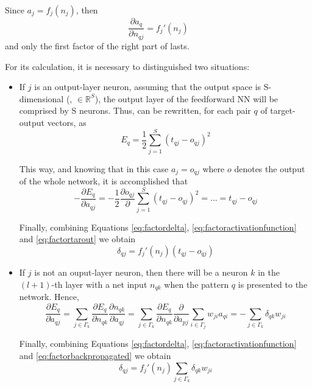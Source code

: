 Since $a_{j}=f_{j}(n_{j})$, then
\begin{equation}
\frac{\partial a_{q}}{\partial n_{qj}}=
f_{j}'(n_{j})
\label{eq:factoractivationfunction}
\end{equation}
and only the first factor of the right part of  lasts. 

For its calculation, it is necessary to distinguished two situations:
\begin{itemize} 
\item If $j$ is an output-layer neuron, assuming that the output space is S-dimensional (\ie, $\in\mathbb{R}^S$), the output layer of the feedforward NN will be comprised by S neurons. Thus,  can be rewritten, for each pair $q$ of target-output vectors, as 
\begin{equation}
E_{q}=\frac{1}{2}\sum_{j=1}^{S} (t_{qj}-o_{qj})^2
\label{eq:patternerrorfunction}
\end{equation}

This way, and knowing that in this case $a_{j}=o_{qj}$ where $o$ denotes the output of the whole network, it is accomplished that
\begin{equation}
-\frac{\partial E_{q}}{\partial a_{qj}} =
-\frac{1}{2}\frac{\partial o_{qj}}{\partial}
\sum_{j=1}^{S} (t_{qj}-o_{qj})^2 =
...= t_{qj}-o_{qj}
\label{eq:factortarout}
\end{equation}

Finally, combining Equations \ref{eq:factordelta}, \ref{eq:factoractivationfunction} and \ref{eq:factortarout} we obtain
\begin{equation}
\delta_{qj}= f_{j}'(n_{j})(t_{qj}-o_{qj})
\label{eq:deltajoutput}
\end{equation}


\item If $j$ is not an ouput-layer neuron, then there will be a neuron $k$ in the $(l+1)$-th layer with a net input $n_{qk}$ when the pattern $q$ is presented to the network. Hence,
\begin{equation}
\frac{\partial E_{q}}{\partial a_{qj}}=
\sum_{j\in \Gamma_{k}}
\frac{\partial E_{q}}{\partial n_{qk}}
\frac{\partial n_{qk}}{\partial a_{qj}}=
\sum_{j\in \Gamma_{k}}
\frac{\partial E_{q}}{\partial n_{qk}}
\frac{\partial}{\partial a_{pj}}
\sum_{i\in \Gamma_{j}}w_{ji}a_{qi}= 
-\sum_{j\in \Gamma_{k}}\delta_{qk}w_{ji}
\label{eq:factorbackpropagated}
\end{equation}

Finally, combining Equations \ref{eq:factordelta}, \ref{eq:factoractivationfunction} and \ref{eq:factorbackpropagated} we obtain
\begin{equation}
\delta_{qj}= f_{j}'(n_{j})
\sum_{j\in \Gamma_{k}}\delta_{qk}w_{ji}
\label{eq:deltajNOoutput}
\end{equation}

\end{itemize}

